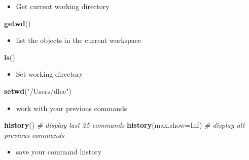 \documentclass[]{article}
\def\tightlist{}
\newenvironment{Shaded}{\begin{snugshade}}{\end{snugshade}}
\newcommand{\KeywordTok}[1]{\textcolor[rgb]{0.13,0.29,0.53}{\textbf{{#1}}}}
\newcommand{\DataTypeTok}[1]{\textcolor[rgb]{0.13,0.29,0.53}{{#1}}}
\newcommand{\StringTok}[1]{\textcolor[rgb]{0.31,0.60,0.02}{{#1}}}
\newcommand{\CommentTok}[1]{\textcolor[rgb]{0.56,0.35,0.01}{\textit{{#1}}}}
\newcommand{\OtherTok}[1]{\textcolor[rgb]{0.56,0.35,0.01}{{#1}}}
\newcommand{\NormalTok}[1]{{#1}}
\numberwithin{equation}{section}
\begin{document}
\begin{itemize}
\tightlist
\item
  Get current working directory
\end{itemize}

\begin{Shaded}
\begin{Highlighting}[]
\KeywordTok{getwd}\NormalTok{() }
\end{Highlighting}
\end{Shaded}

\begin{itemize}
\tightlist
\item
  list the objects in the current workspace
\end{itemize}

\begin{Shaded}
\begin{Highlighting}[]
\KeywordTok{ls}\NormalTok{()}
\end{Highlighting}
\end{Shaded}

\begin{itemize}
\tightlist
\item
  Set working directory
\end{itemize}

\begin{Shaded}
\begin{Highlighting}[]
\KeywordTok{setwd}\NormalTok{(}\StringTok{"/Users/dlee"}\NormalTok{) }
\end{Highlighting}
\end{Shaded}

\begin{itemize}
\tightlist
\item
  work with your previous commands
\end{itemize}

\begin{Shaded}
\begin{Highlighting}[]
\KeywordTok{history}\NormalTok{() }\CommentTok{# display last 25 commands}
\KeywordTok{history}\NormalTok{(}\DataTypeTok{max.show=}\OtherTok{Inf}\NormalTok{) }\CommentTok{# display all previous commands}
\end{Highlighting}
\end{Shaded}

\begin{itemize}
\tightlist
\item
  save your command history
\end{itemize}
\end{document}
